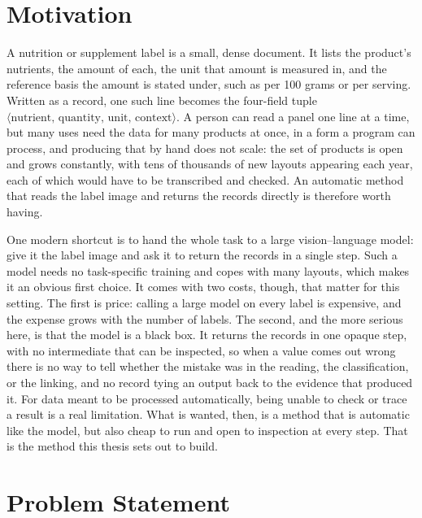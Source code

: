 \section{Motivation}\label{sec:intro-motivation}

A nutrition or supplement label is a small, dense document. It lists the
product's nutrients, the amount of each, the unit that amount is measured in, and
the reference basis the amount is stated under, such as per 100 grams or per
serving. Written as a record, one such line becomes the four-field tuple
$\langle\text{nutrient},\,\text{quantity},\,\text{unit},\,\text{context}\rangle$.
A person can read a panel one line at a time, but many uses need the data for many
products at once, in a form a program can process, and producing that by hand
does not scale: the set of products is open and grows constantly, with tens of
thousands of new layouts appearing each year, each of which would have to be
transcribed and checked. An automatic method that reads the label image and
returns the records directly is therefore worth having.

One modern shortcut is to hand the whole task to a large vision--language model:
give it the label image and ask it to return the records in a single step. Such a
model needs no task-specific training and copes with many layouts, which makes it
an obvious first choice. It comes with two costs, though, that matter for this
setting. The first is price: calling a large model on every label is expensive,
and the expense grows with the number of labels. The second, and the more serious
here, is that the model is a black box. It returns the records in one opaque step,
with no intermediate that can be inspected, so when a value comes out wrong there
is no way to tell whether the mistake was in the reading, the classification, or
the linking, and no record tying an output back to the evidence that produced it.
For data meant to be processed automatically, being unable to check or trace a
result is a real limitation. What is wanted, then, is a method that is automatic
like the model, but also cheap to run and open to inspection at every step. That
is the method this thesis sets out to build.

\section{Problem Statement}\label{sec:intro-problem}

